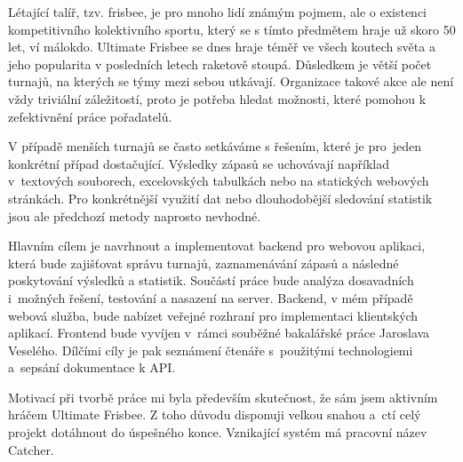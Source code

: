 \begin{introduction}
 Létající talíř, tzv. frisbee, je pro mnoho lidí známým pojmem, ale o existenci kompetitivního kolektivního sportu,
 který se s tímto předmětem hraje už skoro 50 let, ví málokdo. Ultimate Frisbee se dnes hraje téměř
 ve všech koutech světa a jeho popularita v posledních letech raketově stoupá. Důsledkem je větší počet turnajů, na kterých se týmy mezi sebou utkávají.
 Organizace takové akce ale není vždy triviální záležitostí, proto je potřeba hledat možnosti, které pomohou k zefektivnění práce pořadatelů.
 
 V případě menších turnajů se často setkáváme s řešením, které je pro~jeden konkrétní případ dostačující.
 Výsledky zápasů se uchovávají například v~textových souborech, excelovských tabulkách nebo na statických webových stránkách.
 Pro konkrétnější využití dat nebo dlouhodobější sledování statistik jsou ale předchozí metody naprosto nevhodné.
 
 Hlavním cílem je navrhnout a implementovat backend pro webovou aplikaci, která bude zajišťovat správu turnajů, zaznamenávání
 zápasů a následné poskytování výsledků a statistik. Sou\-částí práce bude analýza dosavadních
 i~možných řešení, testování a nasazení na server. Backend, v mém případě webová služba, bude
 nabízet veřejné rozhraní pro implementaci klientských aplikací.
 Frontend bude vyvíjen v~rámci souběžné bakalářské práce Jaroslava Veselého.
 Dílčími cíly je pak seznámení čtenáře s~použitými technologiemi a~sepsání dokumentace k API.
 
 Motivací při tvorbě práce mi byla především skutečnost, že sám jsem aktivním hráčem Ultimate Frisbee.
 Z toho důvodu disponuji velkou snahou a~ctí celý projekt dotáhnout do úspešného konce. Vznikající systém má pracovní název Catcher.
\end{introduction}